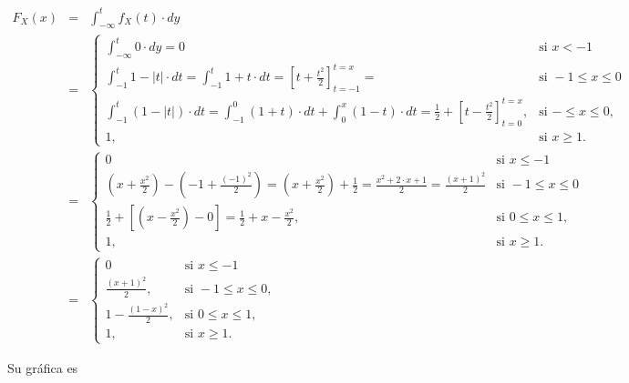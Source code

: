 \documentclass[
]{article}
\begin{document}
\begin{eqnarray*}
F_X(x)&=&\int_{-\infty}^t f_X(t)\cdot  dy\\ &=&
\left\{
\begin{array}{ll}
\int_{-\infty}^t 0\cdot dy=0 & \mbox{si } x<-1\\
\int_{-1}^t  1-|t| \cdot dt= \int_{-1}^t  1+t \cdot dt=
\left[t+\frac{t^2}{2}\right]_{t=-1}^{t=x}= & \mbox{si } -1\leq x\leq 0\\ 
\int_{-1}^t  (1-|t|) \cdot dt= \int_{-1}^0  (1+t)\cdot dt+
\int_{0}^x  (1-t) \cdot dt =\frac{1}{2} + 
\left[t-\frac{t^2}{2}\right]_{t=0}^{t=x}, & \mbox{si } -\leq x\leq 0,\\ 
1, & \mbox{si } x\geq 1.
\end{array}\right.
\\
&=& 
\left\{
\begin{array}{ll}
0 & \mbox{si } x\leq -1\\
\left(x+\frac{x^2}{2}\right)- \left(-1+\frac{(-1)^2}{2}\right)=
\left(x+\frac{x^2}{2}\right)+ \frac{1}{2}=\frac{x^2+2\cdot x+1}{2}=
\frac{(x+1)^2}{2} & \mbox{si } -1\leq x\leq 0\\ 
\frac{1}{2}+ \left[\left(x-\frac{x^2}{2}\right)- 0\right]=
\frac{1}{2}+x-\frac{x^2}{2}, & \mbox{si } 0\leq x\leq 1,\\ 
1, & \mbox{si } x\geq 1.
\end{array}\right.
\\
&=&
\left\{
\begin{array}{ll}
0 & \mbox{si } x\leq -1\\
\frac{(x+1)^2}{2}, & \mbox{si } -1\leq x \leq 0,\\ 
1-\frac{(1-x)^2}{2}, & \mbox{si } 0\leq x\leq 1,\\ 
1, & \mbox{si } x\geq 1.
\end{array}\right.
\end{eqnarray*}

Su gráfica es
\end{document}
